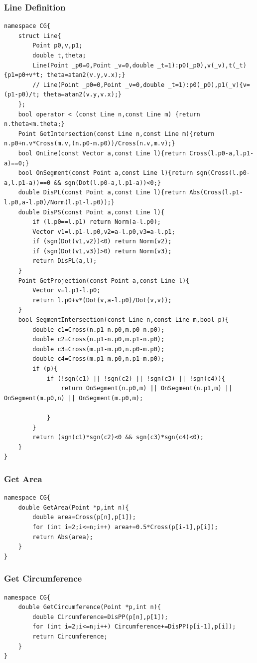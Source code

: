 \documentclass[10pt]{ctexart}
\begin{document}
{\subsubsection{Line Definition}
\begin{lstlisting}
namespace CG{
    struct Line{
        Point p0,v,p1;
        double t,theta;
        Line(Point _p0=0,Point _v=0,double _t=1):p0(_p0),v(_v),t(_t){p1=p0+v*t; theta=atan2(v.y,v.x);}
        // Line(Point _p0=0,Point _v=0,double _t=1):p0(_p0),p1(_v){v=(p1-p0)/t; theta=atan2(v.y,v.x);}
    };
    bool operator < (const Line n,const Line m) {return n.theta<m.theta;}
    Point GetIntersection(const Line n,const Line m){return n.p0+n.v*Cross(m.v,(n.p0-m.p0))/Cross(n.v,m.v);}
    bool OnLine(const Vector a,const Line l){return Cross(l.p0-a,l.p1-a)==0;}
    bool OnSegment(const Point a,const Line l){return sgn(Cross(l.p0-a,l.p1-a))==0 && sgn(Dot(l.p0-a,l.p1-a))<0;}
    double DisPL(const Point a,const Line l){return Abs(Cross(l.p1-l.p0,a-l.p0)/Norm(l.p1-l.p0));}
    double DisPS(const Point a,const Line l){
        if (l.p0==l.p1) return Norm(a-l.p0);
        Vector v1=l.p1-l.p0,v2=a-l.p0,v3=a-l.p1;
        if (sgn(Dot(v1,v2))<0) return Norm(v2);
        if (sgn(Dot(v1,v3))>0) return Norm(v3);
        return DisPL(a,l);
    }
    Point GetProjection(const Point a,const Line l){
        Vector v=l.p1-l.p0;
        return l.p0+v*(Dot(v,a-l.p0)/Dot(v,v));
    }
    bool SegmentIntersection(const Line n,const Line m,bool p){
        double c1=Cross(n.p1-n.p0,m.p0-n.p0);
        double c2=Cross(n.p1-n.p0,m.p1-n.p0);
        double c3=Cross(m.p1-m.p0,n.p0-m.p0);
        double c4=Cross(m.p1-m.p0,n.p1-m.p0);
        if (p){
            if (!sgn(c1) || !sgn(c2) || !sgn(c3) || !sgn(c4)){
                return OnSegment(n.p0,m) || OnSegment(n.p1,m) || OnSegment(m.p0,n) || OnSegment(m.p0,m);

            }
        }
        return (sgn(c1)*sgn(c2)<0 && sgn(c3)*sgn(c4)<0);
    }
}
\end{lstlisting}
\subsubsection{Get Area}
\begin{lstlisting}
namespace CG{
    double GetArea(Point *p,int n){
        double area=Cross(p[n],p[1]);
        for (int i=2;i<=n;i++) area+=0.5*Cross(p[i-1],p[i]);
        return Abs(area);
    }
}
\end{lstlisting}
\subsubsection{Get Circumference}
\begin{lstlisting}
namespace CG{
    double GetCircumference(Point *p,int n){
        double Circumference=DisPP(p[n],p[1]);
        for (int i=2;i<=n;i++) Circumference+=DisPP(p[i-1],p[i]);
        return Circumference;
    }
}
\end{lstlisting}
}
\end{document}
